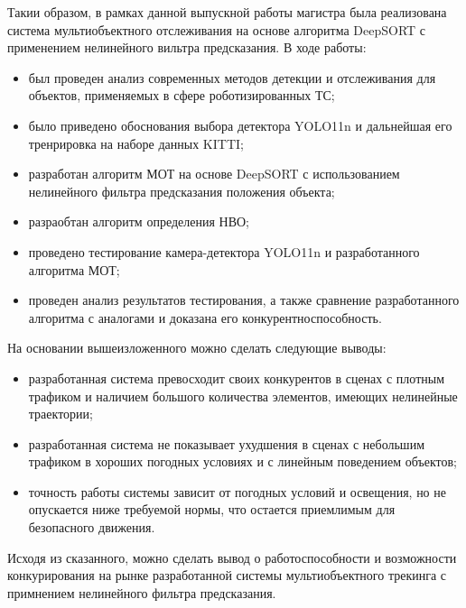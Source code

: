 
Такии образом, в рамках данной выпускной работы магистра была реализована система мультиобъектного отслеживания на основе алгоритма DeepSORT с применением нелинейного вильтра предсказания. В ходе работы:

\begin{itemize}

    \item был проведен анализ современных методов детекции и отслеживания для объектов, применяемых в сфере роботизированных ТС;
    \item было приведено обоснования выбора детектора YOLO11n и дальнейшая его тренрировка на наборе данных KITTI;
    \item разработан алгоритм МОТ на основе DeepSORT с использованием нелинейного фильтра предсказания положения объекта;
    \item разраобтан алгоритм определения НВО;
    \item проведено тестирование камера-детектора YOLO11n и разработанного алгоритма МОТ;
    \item проведен анализ результатов тестирования, а также сравнение разработанного алгоритма с аналогами и доказана его конкурентноспособность.

\end{itemize}

На основании вышеизложенного можно сделать следующие выводы:

\begin{itemize}

    \item разработанная система превосходит своих конкурентов в сценах с плотным трафиком и наличием большого количества элементов, имеющих нелинейные траектории;
    \item разработанная система не показывает ухудшения в сценах с небольшим трафиком в хороших погодных условиях и с линейным поведением объектов;
    \item точность работы системы зависит от погодных условий и освещения, но не опускается ниже требуемой нормы, что остается приемлимым для безопасного движения. 

\end{itemize}

Исходя из сказанного, можно сделать вывод о работоспособности и возможности конкурирования на рынке разработанной системы мультиобъектного трекинга с примнением нелинейного фильтра предсказания.